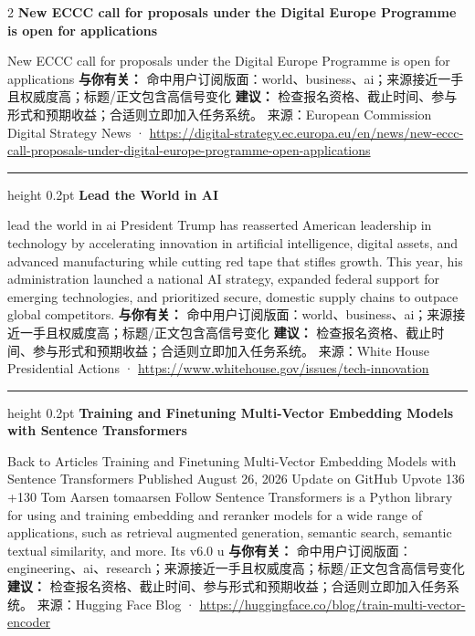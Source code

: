 \documentclass[10.5pt]{ctexart}
\begin{document}
\begin{multicols}{2}
{\large\bfseries New ECCC call for proposals under the Digital Europe Programme is open for applications}\par
New ECCC call for proposals under the Digital Europe Programme is open for applications
\textbf{与你有关：} 命中用户订阅版面：world、business、ai；来源接近一手且权威度高；标题/正文包含高信号变化
\textbf{建议：} 检查报名资格、截止时间、参与形式和预期收益；合适则立即加入任务系统。
{\footnotesize\color{ormuted} 来源：European Commission Digital Strategy News · \url{https://digital-strategy.ec.europa.eu/en/news/new-eccc-call-proposals-under-digital-europe-programme-open-applications}}
\vspace{2mm}
\hrule height 0.2pt
\vspace{2mm}
{\large\bfseries Lead the World in AI}\par
lead the world in ai President Trump has reasserted American leadership in technology by accelerating innovation in artificial intelligence, digital assets, and advanced manufacturing while cutting red tape that stifles growth. This year, his administration launched a national AI strategy, expanded federal support for emerging technologies, and prioritized secure, domestic supply chains to outpace global competitors.
\textbf{与你有关：} 命中用户订阅版面：world、business、ai；来源接近一手且权威度高；标题/正文包含高信号变化
\textbf{建议：} 检查报名资格、截止时间、参与形式和预期收益；合适则立即加入任务系统。
{\footnotesize\color{ormuted} 来源：White House Presidential Actions · \url{https://www.whitehouse.gov/issues/tech-innovation}}
\vspace{2mm}
\hrule height 0.2pt
\vspace{2mm}
{\large\bfseries Training and Finetuning Multi-Vector Embedding Models with Sentence Transformers}\par
Back to Articles Training and Finetuning Multi-Vector Embedding Models with Sentence Transformers Published August 26, 2026 Update on GitHub Upvote 136 +130 Tom Aarsen tomaarsen Follow Sentence Transformers is a Python library for using and training embedding and reranker models for a wide range of applications, such as retrieval augmented generation, semantic search, semantic textual similarity, and more. Its v6.0 u
\textbf{与你有关：} 命中用户订阅版面：engineering、ai、research；来源接近一手且权威度高；标题/正文包含高信号变化
\textbf{建议：} 检查报名资格、截止时间、参与形式和预期收益；合适则立即加入任务系统。
{\footnotesize\color{ormuted} 来源：Hugging Face Blog · \url{https://huggingface.co/blog/train-multi-vector-encoder}}

\end{multicols}
\end{document}
